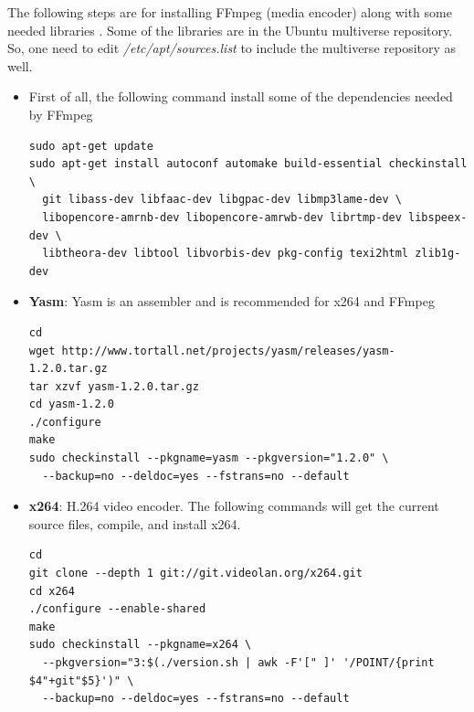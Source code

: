 The following steps are for installing FFmpeg (media encoder) along with some needed libraries \cite{ffmpeg_compile}. Some of the libraries are in the Ubuntu multiverse repository. So, one need to edit \textit{/etc/apt/sources.list} to include the multiverse repository as well.

\begin{itemize}
\item First of all, the following command install some of the dependencies needed by FFmpeg

\begin{code}
\begin{verbatim}
sudo apt-get update
sudo apt-get install autoconf automake build-essential checkinstall \
  git libass-dev libfaac-dev libgpac-dev libmp3lame-dev \
  libopencore-amrnb-dev libopencore-amrwb-dev librtmp-dev libspeex-dev \
  libtheora-dev libtool libvorbis-dev pkg-config texi2html zlib1g-dev
\end{verbatim}
\end{code}

\item{\textbf{Yasm}:} Yasm is an assembler and is recommended for x264 and FFmpeg

\begin{code}
\begin{verbatim}
cd
wget http://www.tortall.net/projects/yasm/releases/yasm-1.2.0.tar.gz
tar xzvf yasm-1.2.0.tar.gz
cd yasm-1.2.0
./configure
make
sudo checkinstall --pkgname=yasm --pkgversion="1.2.0" \
  --backup=no --deldoc=yes --fstrans=no --default
\end{verbatim}
\end{code}

\item{\textbf{x264}:} H.264 video encoder. The following commands will get the current source files, compile, and install x264.
 
\begin{code}
\begin{verbatim}
cd
git clone --depth 1 git://git.videolan.org/x264.git
cd x264
./configure --enable-shared
make
sudo checkinstall --pkgname=x264 \
  --pkgversion="3:$(./version.sh | awk -F'[" ]' '/POINT/{print $4"+git"$5}')" \
  --backup=no --deldoc=yes --fstrans=no --default 
\end{verbatim}
\end{code}


\end{itemize}

